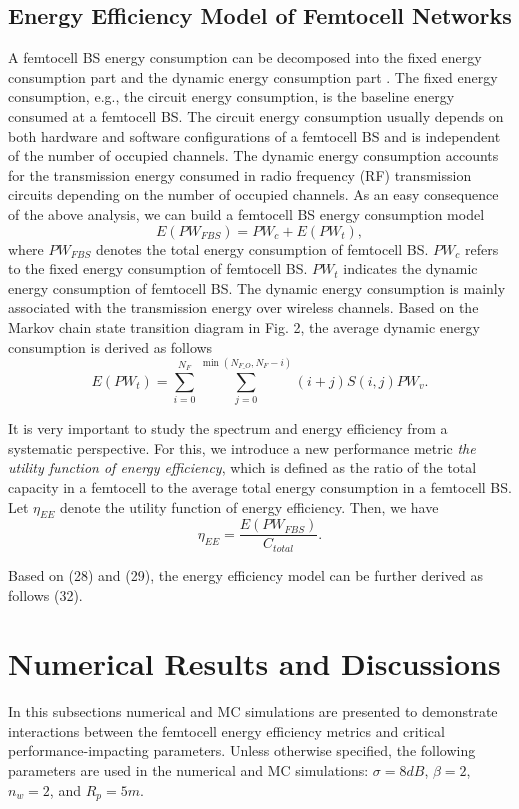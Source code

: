 \documentclass[10pt,final,journal,letterpaper,twoside,twocolumn]{IEEEtran}
\begin{document}
\subsection{Energy Efficiency Model of Femtocell Networks}

A femtocell BS energy consumption can be decomposed into the fixed energy
consumption part and the dynamic energy consumption part \cite{Humar11}. The fixed
energy consumption, e.g., the circuit energy consumption, is the baseline
energy consumed at a femtocell BS. The circuit energy consumption usually
depends on both hardware and software configurations of a femtocell BS and is
independent of the number of occupied channels. The dynamic energy
consumption accounts for the transmission energy consumed in radio
frequency (RF) transmission circuits depending on the number of occupied
channels. As an easy consequence of the above analysis, we can
build a femtocell BS energy consumption model
\[E\left( {P{W_{FBS}}} \right) = P{W_c} + E\left( {P{W_t}} \right) ,\tag{29}\]
where $P{W_{FBS}}$ denotes the total energy consumption of femtocell BS.
$P{W_{c}}$ refers to the fixed energy consumption of femtocell BS. $P{W_{t}}$
indicates the dynamic energy consumption of femtocell BS. The dynamic energy
consumption is mainly associated with the transmission energy over wireless
channels. Based on the Markov chain state transition diagram in Fig. 2, the
average dynamic energy consumption is derived as follows
\[E\left( {P{W_t}} \right) = \sum\limits_{i = 0}^{{N_F}} {\sum\limits_{j = 0}^{\min \left( {{N_{F\_O}},{N_F} - i} \right)} {(i + j)S(i,j)} } P{W_v} .\tag{30}\]

It is very important to study the spectrum and energy efficiency from a systematic
perspective. For this, we introduce a new performance metric \textit{the
utility function of energy efficiency}, which is defined as the ratio of the
total capacity in a femtocell to the average total energy consumption in a
femtocell BS. Let ${\eta _{EE}}$ denote the utility function of energy
efficiency. Then, we have
\[{\eta _{EE}} = \frac{{E\left( {P{W_{FBS}}} \right)}}{{{C_{total}}}} .\tag{31}\]

Based on (28) and (29), the energy efficiency model can be further derived as
follows (32).

\section{Numerical Results and Discussions}
\label{sec5}

In this subsections numerical and MC simulations are presented to demonstrate interactions
between the femtocell energy efficiency metrics and critical performance-impacting parameters. Unless otherwise specified, the following parameters are used in the numerical and MC simulations: $\sigma  = 8dB$,
$\beta  = 2$,  ${n_w} = 2$, and  ${R_p} = 5m$.
\end{document}
